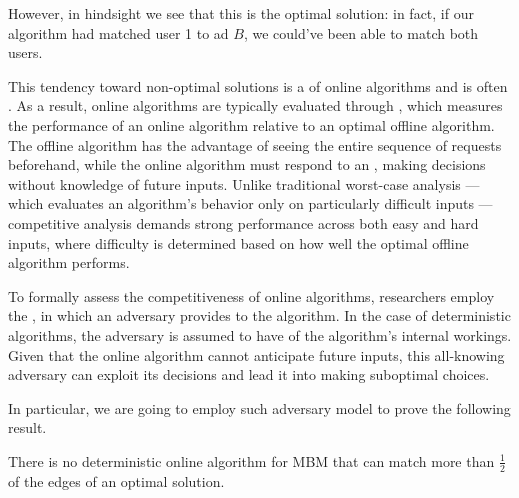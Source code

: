 \documentclass[a4paper, 12pt]{report}
\begin{document}
    However, in hindsight we see that this is  the optimal solution: in fact, if our algorithm had matched user 1 to ad $B$, we could've been able to match both users.

    This tendency toward non-optimal solutions is a  of online algorithms and is often . As a result, online algorithms are typically evaluated through , which measures the performance of an online algorithm relative to an optimal offline algorithm. The offline algorithm has the advantage of seeing the entire sequence of requests beforehand, while the online algorithm must respond to an , making decisions without knowledge of future inputs. Unlike traditional worst-case analysis --- which evaluates an algorithm's behavior only on particularly difficult inputs --- competitive analysis demands strong performance across both easy and hard inputs, where difficulty is determined based on how well the optimal offline algorithm performs.

    To formally assess the competitiveness of online algorithms, researchers employ the , in which an adversary provides  to the algorithm. In the case of deterministic algorithms, the adversary is assumed to have  of the algorithm's internal workings. Given that the online algorithm cannot anticipate future inputs, this all-knowing adversary can exploit its decisions and lead it into making suboptimal choices.

    In particular, we are going to employ such adversary model to prove the following result.

    \begin{framedthm}[label={mbm det}]{}
        There is no deterministic online algorithm for MBM that can match more than $\tfrac{1}{2}$ of the edges of an optimal solution.
    \end{framedthm}
\end{document}
